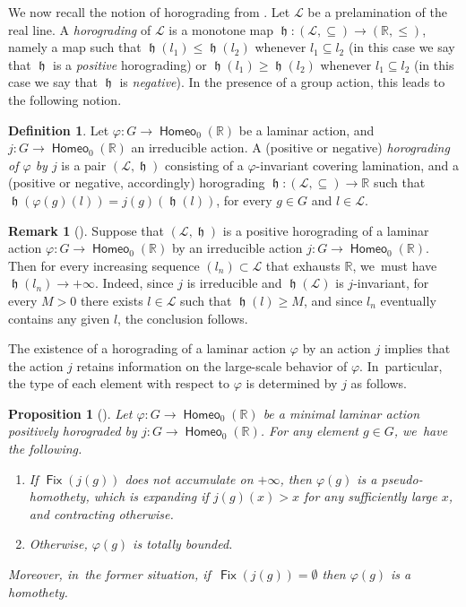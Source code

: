 \documentclass[JEP,XML,SOM,Unicode,NoFloatCountersInSection,published]{cedram}
\newtheorem{prop}[thm]{Proposition}
\theoremstyle{definition}
\newtheorem{dfn}[thm]{Definition}
\newtheorem{rem}[thm]{Remark}
\DeclareMathOperator{\Fix}{\mathsf{Fix}}\let\fix\Fix
\DeclareMathOperator{\homeo}{\mathsf{Homeo}}
\DeclareMathOperator{\hor}{\mathfrak{h}}
\newcommand{\R}{\mathbb{R}}
\newcommand{\Lcal}{\mathcal{L}}
\begin{document}
We now recall the notion of horograding from \cite{BMRT}.
Let $\Lcal$ be a prelamination of the real line. A \emph{horograding} of $\Lcal$ is a monotone map $\hor \colon (\Lcal, \subseteq) \to (\R, \leq)$, namely a map such that $\hor(l_1)\leq \hor(l_2)$ whenever $l_1\subseteq l_2$ (in this case we say that $\hor$ is a \emph{positive} horograding) or $\hor(l_1)\geq \hor(l_2)$ whenever $l_1\subseteq l_2$ (in this case we say that $\hor$ is \emph{negative}). In the presence of a group action, this leads to the following notion.

\begin{dfn}
Let $\varphi\colon G\to \homeo_0(\R)$ be a laminar action, and $j\colon G\to \homeo_0(\R)$ an irreducible action. A (positive or negative) \emph{horograding of $\varphi$ by $j$} is a pair $(\Lcal, \hor)$ consisting of a $\varphi$-invariant covering lamination, and a (positive or negative, accordingly) horograding $\hor\colon (\Lcal, \subseteq) \to \R$ such that $\hor(\varphi(g)(l))=j(g)(\hor(l))$, for every $g\in G$ and $l\in \Lcal$.
\end{dfn}

\begin{rem}[{\cite[Lem.\,8.2.7]{BMRT}}] \label{r-horograding-proper}
Suppose that $(\Lcal, \hor)$ is a positive horograding of a laminar action $\varphi\colon G\to \homeo_0(\R)$ by an irreducible action $j\colon G\to \homeo_0(\R)$. Then for every increasing sequence $(l_n)\subset \Lcal$ that exhausts $\R$, we~must have $\hor(l_n)\to +\infty$. Indeed, since $j$ is irreducible and $\hor(\Lcal)$ is $j$-invariant, for every $M>0$ there exists $l\in \Lcal$ such that $\hor(l)\ge M$, and since $l_n$ eventually contains any given $l$, the conclusion follows.
\end{rem}

The existence of a horograding of a laminar action $\varphi$ by an action $j$ implies that the action $j$ retains information on the large-scale behavior of $\varphi$. In~particular, the type of each element with respect to $\varphi$ is determined by $j$ as follows.

\begin{prop}[{\cite[Prop.\,8.2.10]{BMRT}}]\label{p-classification-elements} Let $\varphi\colon G\to\homeo_0(\R)$ be a minimal laminar action positively horograded by $j\colon G\to\homeo_0(\R)$. For any element $g\in G$, we~have the following.
\begin{enumerate}
\item \label{i-pseudo-homothety} If $\Fix(j(g))$ does not accumulate on $+\infty$, then $\varphi(g)$ is a pseudo-homothety, which is expanding if $j(g)(x)>x$ for any sufficiently large $x$, and contracting otherwise.
\item Otherwise, $\varphi(g)$ is totally bounded.
\end{enumerate}
Moreover, in~the former situation, if~$\Fix(j(g))=\emptyset$ then $\varphi(g)$ is a homothety.
\end{prop}
\end{document}
